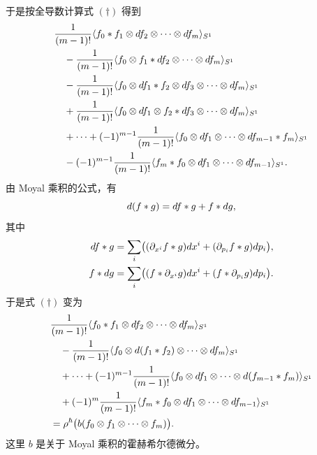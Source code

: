 于是按全导数计算式 $(\dagger)$ 得到
\[
\begin{aligned}
&\frac1{(m-1)!}\langle f_0*f_1\otimes d f_2\otimes\cdots\otimes d f_m\rangle_{S^1}\\
&\quad-\frac1{(m-1)!}\langle f_0\otimes f_1*d f_2\otimes\cdots\otimes d f_m\rangle_{S^1}\\
&\quad-\frac1{(m-1)!}\langle f_0\otimes d f_1*f_2\otimes d f_3\otimes\cdots\otimes d f_m\rangle_{S^1}\\
&\quad+\frac1{(m-1)!}\langle f_0\otimes d f_1\otimes f_2*d f_3\otimes\cdots\otimes d f_m\rangle_{S^1}\\
&\quad+\cdots+(-1)^{m-1}\frac1{(m-1)!}
\langle f_0\otimes d f_1\otimes\cdots\otimes d f_{m-1}*f_m\rangle_{S^1}\\
&\quad-(-1)^{m-1}\frac1{(m-1)!}
\langle f_m*f_0\otimes d f_1\otimes\cdots\otimes d f_{m-1}\rangle_{S^1}.
\end{aligned}
\]
由 Moyal 乘积的公式，有
\[
d(f*g)=d f*g+f*d g,
\]
其中
\[
\begin{aligned}
d f*g&=\sum_i\bigl((\partial_{x^i}f*g)d x^i+(\partial_{p_i}f*g)d p_i\bigr),\\
f*d g&=\sum_i\bigl((f*\partial_{x^i}g)d x^i+(f*\partial_{p_i}g)d p_i\bigr).
\end{aligned}
\]
于是式 $(\dagger)$ 变为
\[
\begin{aligned}
&\frac1{(m-1)!}\langle f_0*f_1\otimes d f_2\otimes\cdots\otimes d f_m\rangle_{S^1}\\
&\quad-\frac1{(m-1)!}\langle f_0\otimes d(f_1*f_2)\otimes\cdots\otimes d f_m\rangle_{S^1}\\
&\quad+\cdots+(-1)^{m-1}\frac1{(m-1)!}
\langle f_0\otimes d f_1\otimes\cdots\otimes d(f_{m-1}*f_m)\rangle_{S^1}\\
&\quad+(-1)^m\frac1{(m-1)!}
\langle f_m*f_0\otimes d f_1\otimes\cdots\otimes d f_{m-1}\rangle_{S^1}\\
&=\rho^\hbar\bigl(b(f_0\otimes f_1\otimes\cdots\otimes f_m)\bigr).
\end{aligned}
\]
这里 $b$ 是关于 Moyal 乘积的霍赫希尔德微分。

